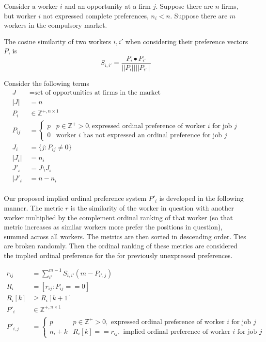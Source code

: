 Consider a worker $i$ and an opportunity at a firm $j$. Suppose there are $n$ firms, but worker $i$ not expressed complete preferences, $n_i < n$. Suppose there are $m$ workers in the compulsory market.

The cosine similarity of two workers $i, i'$ when considering their preference vectors $P$, is
\[S_{i, i'} = \frac{P_{i} \bullet P_{i'}}{||P_i|| ||P_{i'}||}\]

Consider the following terms 
\begin{align*}
J &= \text{set of opportunities at firms in the market} \\
|J| &= n \\
P_i & \in \mathbb{Z}^{+, n \times 1} \\
P_{ij} &= \begin{cases}
p & p \in \mathbb{Z}^+ > 0, \text{expressed ordinal preference of worker $i$ for job $j$}\\
0 & \text{worker $i$ has not expressed an ordinal preference for job $j$}
\end{cases} \\
J_i &= \{j : P_{ij} \neq 0\} \\
|J_i| &= n_i \\
J'_i &= J \setminus J_i \\
|J'_i| &= n - n_i \\
\end{align*}

Our proposed implied ordinal preference system $P'_i$ is developed in the following manner. The metric $r$ is the similarity of the worker in question with another worker multiplied by the complement ordinal ranking of that worker (so that metric increases as similar workers more prefer the positions in question), summed across all workers. The metrics are then sorted in descending order. Ties are broken randomly. Then the ordinal ranking of these metrics are considered the implied ordinal preference for the for previously unexpressed preferences.

\begin{align*}
r_{ij} &= \sum_{i'}^{m-1}S_{i,i'} (m - P_{i',j}) \\
R_i &= [r_{ij}: P_{ij} == 0] \\
R_i[k] & \geq R_i[k+1] \\
P'_i & \in \mathbb{Z}^{+, n \times 1} \\
P'_{i,j} &= \begin{cases}
p & p \in \mathbb{Z}^+ > 0, \text{ expressed ordinal preference of worker $i$ for job $j$}\\
n_i + k & R_i[k] == r_{ij}, \text{ implied ordinal preference of worker $i$ for job $j$}
\end{cases} \\
\end{align*}